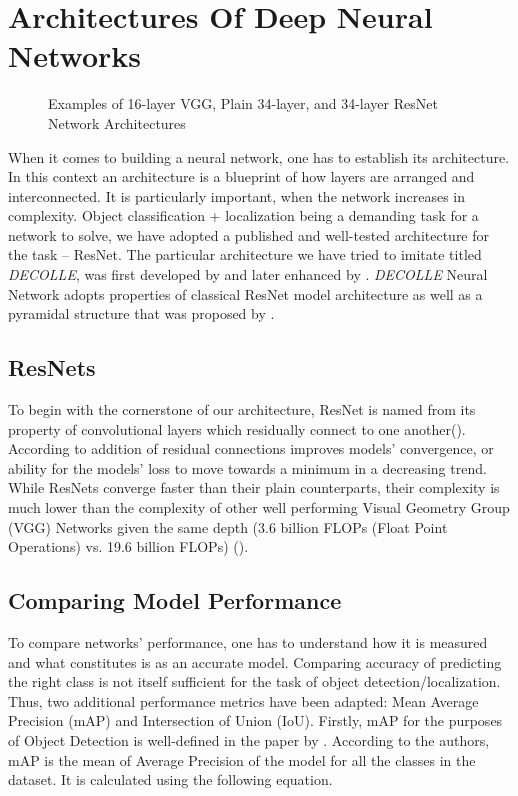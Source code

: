 \section{Architectures Of Deep Neural Networks}

\begin{wrapfigure}[26]{r}{0.42\textwidth}
	\begin{center}
	\end{center}
		\caption{Examples of 16-layer VGG, Plain 34-layer, and 34-layer ResNet Network 
		Architectures}
\end{wrapfigure}

When it comes to building a neural network, one has to establish its
architecture. In this context an architecture is a blueprint of how layers are arranged and interconnected.
It is particularly important, when the network increases in complexity. Object
classification + localization being a demanding task for a network to solve,
we have adopted a published and well-tested architecture for the task --
ResNet. The particular architecture we have tried to imitate titled 
\textit{DECOLLE}, was first developed by  and later
enhanced by . \textit{DECOLLE} Neural Network adopts 
properties of classical ResNet model architecture as well as a pyramidal structure that
was proposed by . 


\subsection{ResNets}


To begin with the cornerstone of our architecture, ResNet is named from its property of convolutional layers which residually connect to one another().
According to 
addition of residual connections improves models' convergence, or ability for the
models' loss to move towards a minimum in a decreasing trend. While
ResNets converge faster than their plain counterparts, their complexity is much lower than the complexity of other well performing Visual Geometry
Group (VGG) Networks given the same depth (3.6 billion FLOPs (Float Point 
Operations) vs. 19.6 billion FLOPs) (). 

\subsection{Comparing Model Performance}
To compare networks' performance, one has to understand how it is measured and what
constitutes is as an accurate model. Comparing accuracy of predicting the right class is not itself sufficient for the task of object detection/localization. Thus,
two additional performance metrics have been adapted: Mean Average Precision (mAP) and
Intersection of Union (IoU). Firstly, mAP for the purposes of Object
Detection is well-defined in the paper by . According to the authors,
mAP is the mean of Average Precision of the model for all the classes in the dataset. It is
calculated using the following equation.


